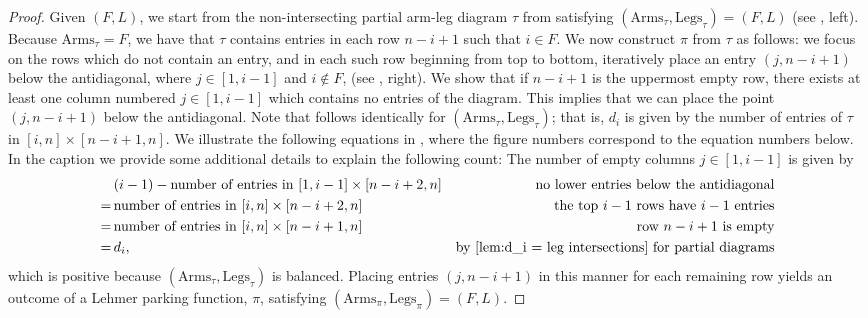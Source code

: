 \documentclass[10pt,a4paper]{amsart}
\newcommand{\arms}{\mathrm{Arms}}
\newcommand{\legs}{\mathrm{Legs}}
\begin{document}
\begin{proof}
    Given $(F,L)$, we start from the non-intersecting partial arm-leg diagram $\tau$ from  satisfying $(\arms_\tau,\legs_\tau)=(F,L)$ (see , left). Because $\arms_\tau=F$, we have that $\tau$ contains entries in each row $n-i+1$ such that $i\in F$.
    We now construct $\pi$ from $\tau$ as follows: we focus on the rows which do not contain an entry, and in each such row 
    beginning from top to bottom, iteratively place an entry $(j,n-i+1)$ below the antidiagonal, where $j\in[1,i-1]$ and $i\notin F$,
    (see , right).
    We show that if $n-i+1$ is the uppermost empty row, 
    there exists at least one column numbered $j\in[1,i-1]$ which contains no entries of the diagram. This implies that we can place the point $(j,n-i+1)$ below the antidiagonal.
    Note that  follows identically for $(\arms_\tau,\legs_\tau)$; that is, $d_i$ is given by the number of entries of $\tau$ in $[i,n]\times[n-i+1,n]$.
    We  illustrate the following equations in , where the figure numbers correspond to the equation numbers below. In the caption we provide some additional details to explain the following count: 
    The number of empty columns $j\in[1,i-1]$ is given by 
    \begin{align}
        \label{eq:2}&(i-1)-\text{number of entries in }[1,i-1]\times[n-i+2,n]&\text{no lower entries below the antidiagonal}\\
        \label{eq:3}=\,&\text{number of entries in }[i,n]\times[n-i+2,n]&\text{the top $i-1$ rows have $i-1$ entries}\\
        \label{eq:4}=\,&\text{number of entries in }[i,n]\times[n-i+1,n]&\text{row $n-i+1$ is empty}\\
        =\,&d_i,&\text{by \Cref{lem:d_i = leg intersections} for partial diagrams}
    \end{align}
    which is positive because $(\arms_\tau,\legs_\tau)$ is balanced. 
    Placing entries $(j,n-i+1)$ in this manner for each remaining row yields an outcome of a Lehmer parking function, $\pi$, satisfying $(\arms_\pi,\legs_\pi)=(F,L)$.
\end{proof}
\end{document}
